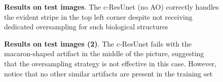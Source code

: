 




\begin{figure}[!b]
\centering
{}
\caption{\textbf{Results on test images}. 
The c-ResUnet (no AO) correctly handles the evident stripe in the top left corner despite not receiving dedicated oversampling for such biological structures
} 
\label{fig:predictions}
\end{figure}
\begin{figure}[ht]\ContinuedFloat
\centering

\caption{\textbf{Results on test images (2)}. 
The c-ResUnet fails with the \mbox{macaron-shaped} artifact in the middle of the picture, suggesting that the oversampling strategy is not effective in this case. However, notice that no other similar artifacts are present in the training set
} 
\end{figure}


